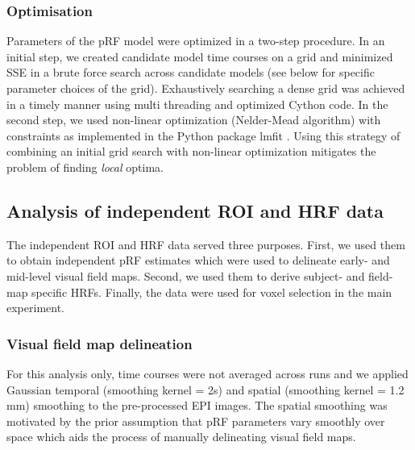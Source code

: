 \subsubsection{Optimisation}
Parameters of the pRF model were optimized in a two-step procedure. In an initial step, we created candidate model time courses on a grid and minimized SSE in a brute force search across candidate models (see below for specific parameter choices of the grid). Exhaustively searching a dense grid was achieved in a timely manner using multi threading and optimized Cython code. In the second step, we used non-linear optimization (Nelder-Mead algorithm) with constraints as implemented in the Python package lmfit \parencite{scipy2001, lmfit2018}. Using this strategy of combining an initial grid search with non-linear optimization mitigates the problem of finding \textit{local} optima.

\subsection{Analysis of independent ROI and HRF data}
The independent ROI and HRF data served three purposes. First, we used them to obtain independent pRF estimates which were used to delineate early- and mid-level visual field maps. Second, we used them to derive subject- and field-map specific HRFs. Finally, the data were used for voxel selection in the main experiment.

\subsubsection{Visual field map delineation}
For this analysis only, time courses were not averaged across runs and we applied Gaussian temporal (smoothing kernel = 2s) and spatial (smoothing kernel = 1.2 mm) smoothing to the pre-processed EPI images. The spatial smoothing was motivated by the prior assumption that pRF parameters vary smoothly over space which aids the process of manually delineating visual field maps.

